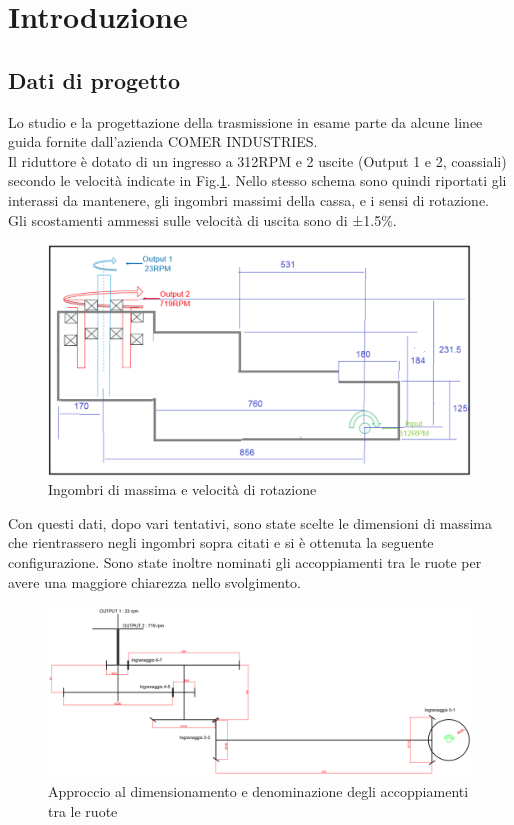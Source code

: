 \section{Introduzione}
\subsection{Dati di progetto}
Lo studio e la progettazione della trasmissione in esame parte da alcune linee guida fornite dall'azienda COMER INDUSTRIES. \\
Il riduttore è dotato di un ingresso a 312RPM e 2 uscite (Output 1 e 2, coassiali) secondo le velocità indicate in Fig.\ref{fig:Ingombri}. Nello stesso schema sono quindi riportati gli interassi da mantenere, gli ingombri massimi della cassa, e i sensi di rotazione. Gli scostamenti ammessi sulle velocità di uscita sono di ±1.5\%.\\
\begin{figure}[h]
    \centering
    \includegraphics[scale=0.5]{Immagini/Ingombri.png}
    \caption{Ingombri di massima e velocità di rotazione}
    \label{fig:Ingombri}
\end{figure}

Con questi dati, dopo vari tentativi, sono state scelte le dimensioni di massima che rientrassero negli ingombri sopra citati e si è ottenuta la seguente configurazione. Sono state inoltre nominati gli accoppiamenti tra le ruote per avere una maggiore chiarezza nello svolgimento. 
\begin{figure}[h]
    \centering
    \includegraphics[scale=0.6]{Immagini/DenominazioneRiduttore.png}
    \caption{Approccio al dimensionamento e denominazione degli accoppiamenti tra le ruote}
    \label{fig:DenominazioniRuote}
\end{figure}
